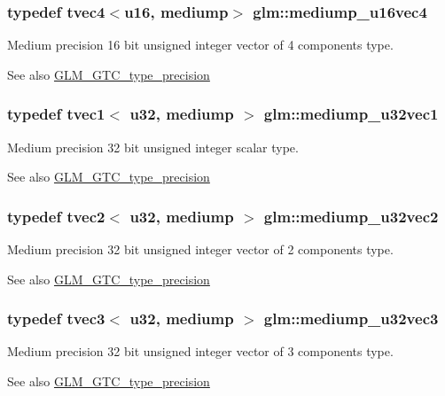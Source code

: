\subsubsection[{mediump\+\_\+u16vec4}]{\setlength{\rightskip}{0pt plus 5cm}typedef tvec4$<${\bf u16}, mediump$>$ {\bf glm\+::mediump\+\_\+u16vec4}}\label{namespaceglm_a3621e92947a8c0c4cfb4b07052bfda63}
Medium precision 16 bit unsigned integer vector of 4 components type. \begin{DoxySeeAlso}{See also}
\hyperlink{group__gtc__type__precision}{G\+L\+M\+\_\+\+G\+T\+C\+\_\+type\+\_\+precision} 
\end{DoxySeeAlso}
\hypertarget{namespaceglm_a9226c5a5159a6da4fd4385a3e5036217}{}
\subsubsection[{mediump\+\_\+u32vec1}]{\setlength{\rightskip}{0pt plus 5cm}typedef tvec1$<$ {\bf u32}, mediump $>$ {\bf glm\+::mediump\+\_\+u32vec1}}\label{namespaceglm_a9226c5a5159a6da4fd4385a3e5036217}
Medium precision 32 bit unsigned integer scalar type. \begin{DoxySeeAlso}{See also}
\hyperlink{group__gtc__type__precision}{G\+L\+M\+\_\+\+G\+T\+C\+\_\+type\+\_\+precision} 
\end{DoxySeeAlso}
\hypertarget{namespaceglm_a1f1cfdf3e7d134d53e46ac233feb73d8}{}
\subsubsection[{mediump\+\_\+u32vec2}]{\setlength{\rightskip}{0pt plus 5cm}typedef tvec2$<$ {\bf u32}, mediump $>$ {\bf glm\+::mediump\+\_\+u32vec2}}\label{namespaceglm_a1f1cfdf3e7d134d53e46ac233feb73d8}
Medium precision 32 bit unsigned integer vector of 2 components type. \begin{DoxySeeAlso}{See also}
\hyperlink{group__gtc__type__precision}{G\+L\+M\+\_\+\+G\+T\+C\+\_\+type\+\_\+precision} 
\end{DoxySeeAlso}
\hypertarget{namespaceglm_aa83a4e6ef9880f1cefb6224a6f8676b6}{}
\subsubsection[{mediump\+\_\+u32vec3}]{\setlength{\rightskip}{0pt plus 5cm}typedef tvec3$<$ {\bf u32}, mediump $>$ {\bf glm\+::mediump\+\_\+u32vec3}}\label{namespaceglm_aa83a4e6ef9880f1cefb6224a6f8676b6}
Medium precision 32 bit unsigned integer vector of 3 components type. \begin{DoxySeeAlso}{See also}
\hyperlink{group__gtc__type__precision}{G\+L\+M\+\_\+\+G\+T\+C\+\_\+type\+\_\+precision} 
\end{DoxySeeAlso}
\hypertarget{namespaceglm_aed40e7b751d8cdd3fe747abd19d92790}{}

